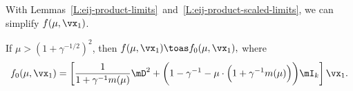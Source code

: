 With Lemmas~\ref{L:eij-product-limits}~and~\ref{L:eij-product-scaled-limits},
we can simplify $f(\mu, \vx_1)$.

\begin{lemma}
    If $\mu > (1 + \gamma^{-1/2})^2$, then
    \(
        f( \mu, \vx_1 )
            \toas
                f_0( \mu, \vx_1),
    \)
    where
    \[
        f_0( \mu, \vx_1 )
            =
                \left[
                    \frac{1}{ 1 + \gamma^{-1} m(\mu) }
                    \mD^2 
                    +
                    \bigg(
                        1 
                        - 
                        \gamma^{-1}
                        -
                        \mu
                        \cdot
                        \Big(
                            1
                            +
                            \gamma^{-1} m(\mu)
                        \Big)
                    \bigg)
                    \mI_k
                \right] \vx_1.
    \]
\end{lemma}

